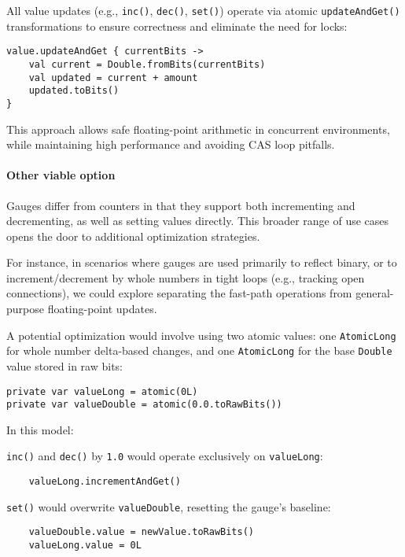 All value updates (e.g., \texttt{inc()}, \texttt{dec()}, \texttt{set()}) operate via atomic \texttt{updateAndGet()} transformations to ensure correctness and eliminate the need for locks:

\begin{verbatim}
value.updateAndGet { currentBits ->
    val current = Double.fromBits(currentBits)
    val updated = current + amount
    updated.toBits()
}
\end{verbatim}

This approach allows safe floating-point arithmetic in concurrent environments, while maintaining high performance and avoiding CAS loop pitfalls.


\paragraph{Other viable option}
Gauges differ from counters in that they support both incrementing and decrementing, as well as setting values directly. This broader range of use cases opens the door to additional optimization strategies.

For instance, in scenarios where gauges are used primarily to reflect binary, or to increment/decrement by whole numbers in tight loops (e.g., tracking open connections), we could explore separating the fast-path operations from general-purpose floating-point updates.

A potential optimization would involve using two atomic values: one \texttt{AtomicLong} for whole number delta-based changes, and one \texttt{AtomicLong} for the base \texttt{Double} value stored in raw bits:

\begin{verbatim}
private var valueLong = atomic(0L)
private var valueDouble = atomic(0.0.toRawBits())
\end{verbatim}

In this model:

    \texttt{inc()} and \texttt{dec()} by \texttt{1.0} would operate exclusively on \texttt{valueLong}:
    \begin{verbatim}
    valueLong.incrementAndGet()
    \end{verbatim}

    \texttt{set()} would overwrite \texttt{valueDouble}, resetting the gauge’s baseline:
    \begin{verbatim}
    valueDouble.value = newValue.toRawBits()
    valueLong.value = 0L
    \end{verbatim}

